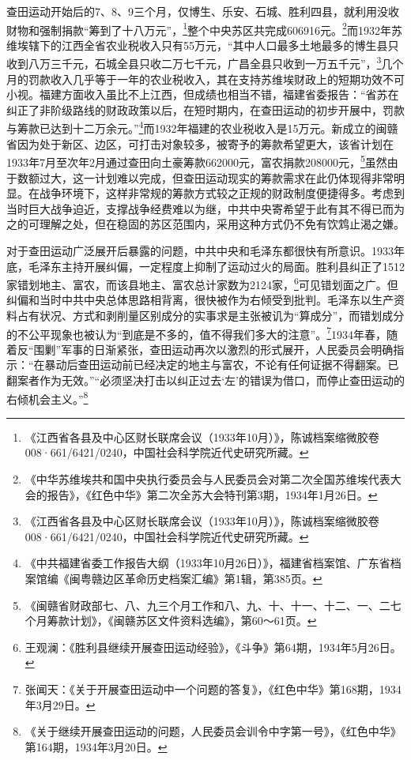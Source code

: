 查田运动开始后的7、8、9三个月，仅博生、乐安、石城、胜利四县，就利用没收财物和强制捐款“筹到了十八万元”，\footnote{《江西省各县及中心区财长联席会议（1933年10月）》，陈诚档案缩微胶卷008·661/6421/0240，中国社会科学院近代史研究所藏。}整个中央苏区共完成606916元。\footnote{《中华苏维埃共和国中央执行委员会与人民委员会对第二次全国苏维埃代表大会的报告》，《红色中华》第二次全苏大会特刊第3期，1934年1月26日。}而1932年苏维埃辖下的江西全省农业税收入只有55万元，“其中人口最多土地最多的博生县只收到八万三千元，石城全县只收二万七千元，广昌全县只收到一万五千元”，\footnote{《江西省各县及中心区财长联席会议（1933年10月）》，陈诚档案缩微胶卷008·661/6421/0240，中国社会科学院近代史研究所藏。}几个月的罚款收入几乎等于一年的农业税收入，其在支持苏维埃财政上的短期功效不可小视。福建方面收入虽比不上江西，但成绩也相当不错，福建省委报告：“省苏在纠正了非阶级路线的财政政策以后，在短时期内，在查田运动的初步开展中，罚款与筹款已达到十二万余元。”\footnote{《中共福建省委工作报告大纲（1933年10月26日）》，福建省档案馆、广东省档案馆编《闽粤赣边区革命历史档案汇编》第1辑，第385页。}而1932年福建的农业税收入是15万元。新成立的闽赣省因为处于新区、边区，可打击对象较多，被寄予的筹款希望更大，该省计划在1933年7月至次年2月通过查田向土豪筹款662000元，富农捐款208000元，\footnote{《闽赣省财政部七、八、九三个月工作和八、九、十、十一、十二、一、二七个月筹款计划》，《闽赣苏区文件资料选编》，第60～61页。}虽然由于数额过大，这一计划难以完成，但查田运动现实的筹款需求在此仍体现得非常明显。在战争环境下，这样非常规的筹款方式较之正规的财政制度便捷得多。考虑到当时巨大战争迫近，支撑战争经费难以为继，中共中央寄希望于此有其不得已而为之的可理解之处，但在稳固的苏区范围内，采用这种方式仍不免有饮鸩止渴之嫌。


对于查田运动广泛展开后暴露的问题，中共中央和毛泽东都很快有所意识。1933年底，毛泽东主持开展纠偏，一定程度上抑制了运动过火的局面。胜利县纠正了1512家错划地主、富农，而该县地主、富农总计家数为2124家，\footnote{王观澜：《胜利县继续开展查田运动经验》，《斗争》第64期，1934年5月26日。}可见错划面之广。但纠偏和当时中共中央总体思路相背离，很快被作为右倾受到批判。毛泽东以生产资料占有状况、方式和剥削量区别成分的实事求是主张被讥为“算成分”，而错划成分的不公平现象也被认为“到底是不多的，值不得我们多大的注意”。\footnote{张闻天：《关于开展查田运动中一个问题的答复》，《红色中华》第168期，1934年3月29日。}1934年春，随着反“围剿”军事的日渐紧张，查田运动再次以激烈的形式展开，人民委员会明确指示：“在暴动后查田运动前已经决定的地主与富农，不论有任何证据不得翻案。已翻案者作为无效。”“必须坚决打击以纠正过去‘左’的错误为借口，而停止查田运动的右倾机会主义。”\footnote{《关于继续开展查田运动的问题，人民委员会训令中字第一号》，《红色中华》第164期，1934年3月20日。}



